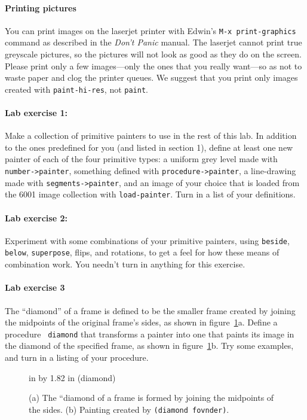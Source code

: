 \documentclass[11pt]{article}
\begin{document}
\paragraph{Printing pictures} You can print images on the laserjet
printer with Edwin's {\tt M-x print-graphics} command as described
in the {\em Don't Panic} manual.  The laserjet cannot print true
greyscale pictures, so the pictures will not look as good as they do
on the screen. Please print only a few images---only the ones that you
really want---so as not to waste paper and clog the printer queues.
We suggest that you print only images created with {\tt paint-hi-res},
not {\tt paint}.

\paragraph{Lab exercise 1:}
Make a collection of primitive painters to use in the rest of this
lab.  In addition to the ones predefined for you (and listed in
section 1), define at least one new painter of each of the four
primitive types: a uniform grey level made with {\tt number->painter},
something defined with {\tt procedure->painter}, a line-drawing made
with {\tt segments->painter}, and an image of your choice that is
loaded from the 6001 image collection with {\tt load-painter}.  Turn
in a list of your definitions.

\paragraph{Lab exercise 2:}
Experiment with some combinations of your primitive painters, using
{\tt beside}, {\tt below}, {\tt superpose}, flips, and rotations, to get a
feel for how these means of combination work.  You needn't turn in
anything for this exercise.

\paragraph{Lab exercise 3}
The ``diamond'' of a frame is defined to be the smaller frame
created by joining the midpoints of the original frame's sides, as shown in
figure~\ref{diamond}a.  Define a procedure {\tt
diamond} that transforms a painter into one that paints its image in
the diamond of the specified frame, as shown in
figure~\ref{diamond}b.  Try some examples, and turn in a listing of
your procedure.

\begin{figure}
 in by 1.82 in (diamond)
\caption{{\protect\footnotesize
(a) The ``diamond of a frame is formed by joining the midpoints
of the sides.  (b) Painting created by {\tt (diamond fovnder)}.}}
\label{diamond}
\end{figure} 
\end{document}
